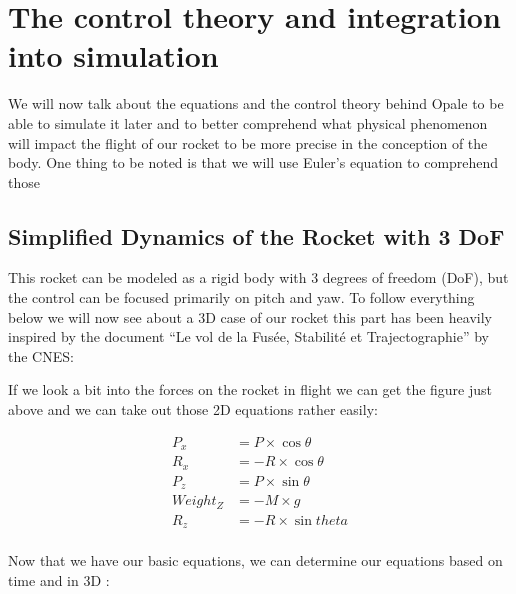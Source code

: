 \section{The control theory and integration into simulation}

We will now talk about the equations and the control theory behind Opale to be
able to simulate it later and to better comprehend what physical phenomenon
will impact the flight of our rocket to be more precise in the conception of
the body. One thing to be noted is that we will use Euler’s equation to
comprehend those

\subsection{Simplified Dynamics of the Rocket with 3 DoF}

This rocket can be modeled as a rigid body with 3 degrees of freedom (DoF), but
the control can be focused primarily on pitch and yaw. To follow everything
below we will now see about a 3D case of our rocket this part has been heavily
inspired by the document “Le vol de la Fusée, Stabilité et Trajectographie” by
the CNES:



If we look a bit into the forces on the rocket in flight we can get the figure
just above and we can take out those 2D equations rather easily:

\begin{align*}
    P_x      & = P \times \cos{\theta}   \\
    R_x      & = - R \times \cos{\theta} \\
    P_z      & = P \times \sin{\theta}   \\
    Weight_Z & = -M \times g             \\
    R_z      & = -R \times \sin {theta}  \\
\end{align*}

Now that we have our basic equations, we can determine our equations based on
time and in 3D :

